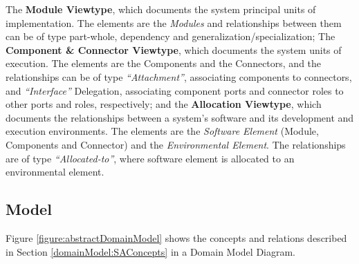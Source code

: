 \documentclass{llncs}
\begin{document}
The \textbf{Module Viewtype}, which documents the system principal units of implementation. The elements are the \textit{Modules} and relationships between them can be of type part-whole, dependency and generalization/specialization; The \textbf{Component \& Connector Viewtype}, which documents the system units of execution. The elements are the Components and the Connectors, and the relationships can be of type \textit{``Attachment''}, associating components to connectors, and \textit{``Interface''} Delegation, associating component ports and connector roles to other ports and roles, respectively; and the \textbf{Allocation Viewtype}, which documents the relationships between a system's software and its development and execution environments. The elements are the \textit{Software Element} (Module, Components and Connector) and the \textit{Environmental Element}. The relationships are of type \textit{``Allocated-to''}, where software element is allocated to an environmental element. 

\subsection{Model}
\label{section:domainModel}
Figure \ref{figure:abstractDomainModel} shows the concepts and relations described in Section \ref{domainModel:SAConcepts} in a Domain Model Diagram.
 
\end{document}
